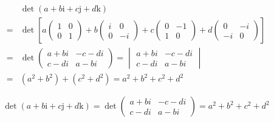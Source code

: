 \documentclass[
]{book}
\theoremstyle{definition}
\theoremstyle{definition}
\theoremstyle{definition}
\theoremstyle{definition}
\theoremstyle{remark}
\begin{document}
\[
\begin{aligned}
 & \det\left(a+b\mathrm{i}+c\mathrm{j}+d\mathrm{k}\right)\\
= & \det\left[a\begin{pmatrix}1 & 0\\
0 & 1
\end{pmatrix}+b\begin{pmatrix}i & 0\\
0 & -i
\end{pmatrix}+c\begin{pmatrix}0 & -1\\
1 & 0
\end{pmatrix}+d\begin{pmatrix}0 & -i\\
-i & 0
\end{pmatrix}\right]\\
= & \det\begin{pmatrix}a+bi & -c-di\\
c-di & a-bi
\end{pmatrix}=\begin{vmatrix}a+bi & -c-di\\
c-di & a-bi
\end{vmatrix}\\
= & \left(a^{2}+b^{2}\right)+\left(c^{2}+d^{2}\right)=a^{2}+b^{2}+c^{2}+d^{2}
\end{aligned}
\]

\[
\det\left(a+b\mathrm{i}+c\mathrm{j}+d\mathrm{k}\right)=\det\begin{pmatrix}a+bi & -c-di\\
c-di & a-bi
\end{pmatrix}=a^{2}+b^{2}+c^{2}+d^{2}
\]
\end{document}

